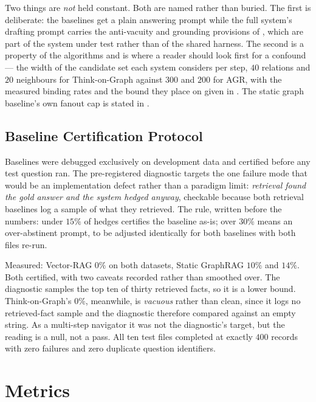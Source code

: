 Two things are \emph{not} held constant. Both are named rather than buried.
The first is deliberate: the baselines get a plain answering prompt while the
full system's drafting prompt carries the anti-vacuity and grounding provisions
of , which are part of the system under test
rather than of the shared harness. The second is a property of the algorithms
and is where a reader should look first for a confound --- the width of the
candidate set each system considers per step, $40$ relations and $20$ neighbours
for Think-on-Graph against $300$ and $200$ for AGR, with the measured binding
rates and the bound they place on  given in
. The static graph baseline's own fanout cap is stated in
.

\subsection{Baseline Certification Protocol}

Baselines were debugged exclusively on development data and certified before any
test question ran. The pre-registered diagnostic targets the one failure mode
that would be an implementation defect rather than a paradigm limit:
\emph{retrieval found the gold answer and the system hedged anyway}, checkable
because both retrieval baselines log a sample of what they retrieved. The rule,
written before the numbers: under $15\%$ of hedges certifies the baseline as-is;
over $30\%$ means an over-abstinent prompt, to be adjusted identically for both
baselines with both files re-run.

Measured: Vector-RAG $0\%$ on both datasets, Static GraphRAG $10\%$ and $14\%$.
Both certified, with two caveats recorded rather than smoothed over. The
diagnostic samples the top ten of thirty retrieved facts, so it is a lower
bound. Think-on-Graph's $0\%$, meanwhile, is \emph{vacuous} rather than clean,
since it logs no retrieved-fact sample and the diagnostic therefore compared
against an empty string. As a multi-step navigator it was not the diagnostic's
target, but the reading is a null, not a pass. All ten test files completed at
exactly $400$ records with zero failures and zero duplicate question
identifiers.

\section{Metrics}\label{sec:metrics}

